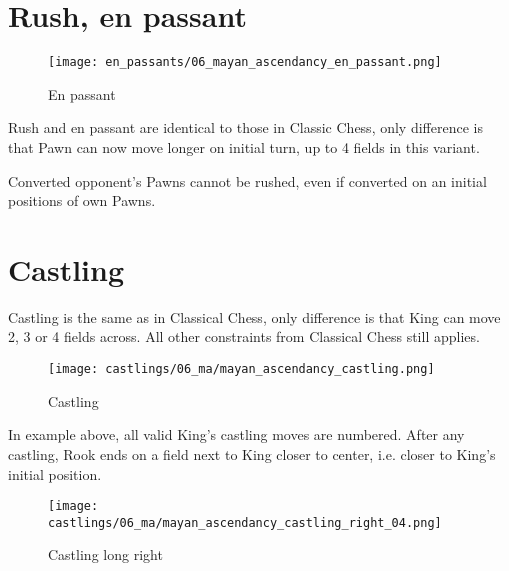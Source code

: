 \clearpage %

\section*{Rush, en passant}

\noindent
\begin{wrapfigure}{l}{0.4\textwidth}
\centering
\texttt{[image: en\_passants/06\_mayan\_ascendancy\_en\_passant.png]}
\caption{En passant}
\label{fig:06_mayan_ascendancy_en_passant}
\end{wrapfigure}
Rush and en passant are identical to those in Classic Chess, only difference
is that Pawn can now move longer on initial turn, up to 4 fields in this
variant.

Converted opponent's Pawns cannot be rushed, even if converted on an initial positions
of own Pawns.

\clearpage %

\section*{Castling}

Castling is the same as in Classical Chess, only difference is that King can move 2, 3 or 4 fields across.
All other constraints from Classical Chess still applies.

\noindent
\begin{figure}[!h]
\texttt{[image: castlings/06\_ma/mayan\_ascendancy\_castling.png]}
\caption{Castling}
\label{fig:mayan_ascendancy_castling}
\end{figure}

In example above, all valid King's castling moves are numbered. After any castling, Rook
ends on a field next to King closer to center, i.e. closer to King's initial position.

\noindent
\begin{figure}[!h]
\texttt{[image: castlings/06\_ma/mayan\_ascendancy\_castling\_right\_04.png]}
\caption{Castling long right}
\label{fig:mayan_ascendancy_castling_right_04}
\end{figure}

